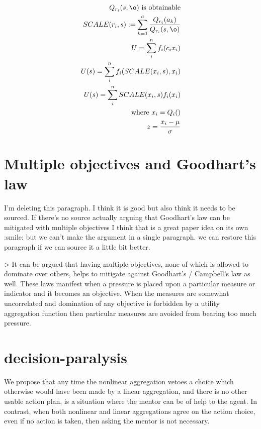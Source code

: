 \begin{align}
    
    Q_{r_i}(s,\o) \text{ is obtainable} \\

SCALE(r_i,s) :=\sum^{a}_{k=1}\frac{Q_{r_i}(a_k)}{Q_{r_i}(s,\o)} \\

U=\sum_{i}^n{f_i(c_i x_i)} \\

U(s)=\sum_{i}^n{f_i(SCALE(x_i,s), x_i)} \\

U(s)=\sum_{i}^n{SCALE(x_i,s)f_i(x_i)} \\

\text{where } x_i = Q_i() \\

z =\frac{x_i-\mu}{\sigma} \\


\end{align}

\section{Multiple objectives and Goodhart's law}
I’m deleting this paragraph. I think it is good but also think it needs to be sourced. If there’s no source actually arguing that Goodhart’s law can be mitigated with multiple objectives I think that is a great paper idea on its own :smile: but we can’t make the argument in a single paragraph.
we can restore this paragraph if we can source it a little bit better.

> It can be argued that having multiple objectives, none of which is allowed to dominate over others, helps to mitigate against Goodhart’s / Campbell’s law as well. These laws manifest when a pressure is placed upon a particular measure or indicator and it becomes an objective. When the measures are somewhat uncorrelated and domination of any objective is forbidden by a utility aggregation function then particular measures are avoided from bearing too much pressure.


\section{decision-paralysis}

We propose that any time the nonlinear aggregation vetoes a choice which otherwise would have been made by a linear aggregation, and there is no other usable action plan, is a situation where the mentor can be of help to the agent. %
In contrast, when both nonlinear and linear aggregations agree on the action choice, even if no action is taken, then asking the mentor is not necessary.

